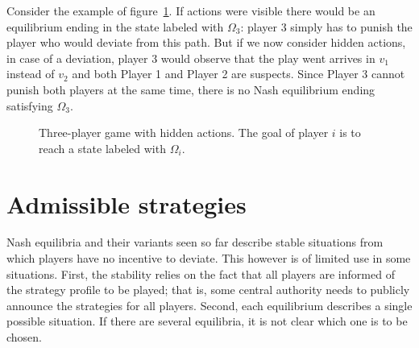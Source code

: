 \begin{example}
  Consider the example of figure~\ref{fig:hidden}.
  If actions were visible there would be an equilibrium ending in the
  state labeled with $\Omega_3$: player 3 simply has to punish the player
  who would deviate from this path.
  But if we now consider hidden actions, in case of a deviation, player 3
  would observe that the play went arrives in $v_1$ instead of $v_2$
  and both Player 1 and Player 2 are suspects.
  Since Player 3 cannot punish both players at the same time, there is no
  Nash equilibrium ending satisfying $\Omega_3$.
\end{example}
\begin{figure}
\begin{center}
\caption{Three-player game with hidden actions. The goal of
  player $i$ is to reach a state labeled with $\Omega_i$.}
\label{fig:hidden}
\end{center}
\end{figure}

\section{Admissible strategies}\label{admissible-strategies}
Nash equilibria and their variants seen so far describe stable situations
from which players have no incentive to deviate. This however is of limited use
in some situations. First, the stability relies on the fact that all players are informed
of the strategy profile to be played; that is, some central authority needs to publicly
announce the strategies for all players. Second, each equilibrium describes a single possible
situation. If there are several equilibria, it is not clear which one is to be chosen.

